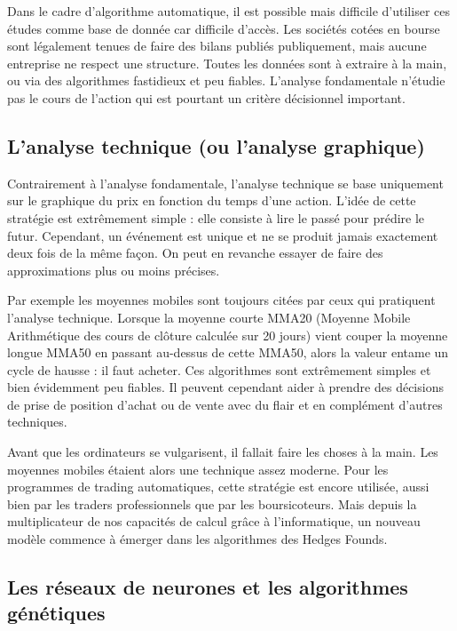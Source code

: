 \documentclass[a4paper,12pt]{article}
\begin{document}
Dans le cadre d'algorithme automatique, il est possible mais difficile d'utiliser ces études comme base de donnée car difficile d'accès. Les sociétés cotées en bourse sont légalement tenues de faire des bilans publiés publiquement, mais aucune entreprise ne respect une structure. Toutes les données sont à extraire à la main, ou via des algorithmes fastidieux et peu fiables. L'analyse fondamentale n'étudie pas le cours de l'action qui est pourtant un critère décisionnel important.

\subsection{L'analyse technique (ou l'analyse graphique)}
Contrairement à l'analyse fondamentale, l'analyse technique se base uniquement sur le graphique du prix en fonction du temps d'une action. L'idée de cette stratégie est extrêmement simple : elle consiste à lire le passé pour prédire le futur. Cependant, un événement est unique et ne se produit jamais exactement deux fois de la même façon. On peut en revanche essayer de faire des approximations plus ou moins précises. 

Par exemple les moyennes mobiles sont toujours citées par ceux qui pratiquent l'analyse technique. Lorsque la moyenne courte MMA20 (Moyenne Mobile Arithmétique des cours de clôture calculée sur 20 jours) vient couper la moyenne longue MMA50 en passant au-dessus de cette MMA50, alors la valeur entame un cycle de hausse : il faut acheter. Ces algorithmes sont extrêmement simples et bien évidemment peu fiables. Il peuvent cependant aider à prendre des décisions de prise de position d'achat ou de vente avec du flair et en complément d'autres techniques. 

Avant que les ordinateurs se vulgarisent, il fallait faire les choses à la main. Les moyennes mobiles étaient alors une technique assez moderne. Pour les programmes de trading automatiques, cette stratégie est encore utilisée, aussi bien par les traders professionnels que par les boursicoteurs. Mais depuis la multiplicateur de nos capacités de calcul grâce à l'informatique, un nouveau modèle commence à émerger dans les algorithmes des Hedges Founds.

\subsection{Les réseaux de neurones et les algorithmes génétiques}
\end{document}
